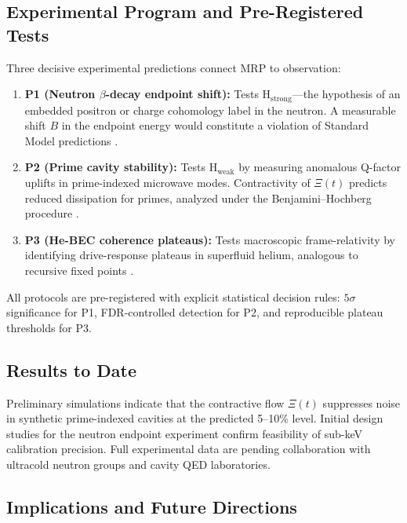 \documentclass[12]{amsart}
\theoremstyle{plain}
\begin{document}
\subsection{Experimental Program and Pre-Registered Tests}

Three decisive experimental predictions connect MRP to observation:

\begin{enumerate}
    \item \textbf{P1 (Neutron $\beta$-decay endpoint shift):} Tests H$_{\text{strong}}$---the hypothesis of an embedded positron or charge cohomology label in the neutron. A measurable shift $B$ in the endpoint energy would constitute a violation of Standard Model predictions \cite{Weinberg:1995mt,ParticleDataGroup:2022pth,Wietfeldt:2011ue}.
    
    \item \textbf{P2 (Prime cavity stability):} Tests H$_{\text{weak}}$ by measuring anomalous Q-factor uplifts in prime-indexed microwave modes. Contractivity of $\Xi(t)$ predicts reduced dissipation for primes, analyzed under the Benjamini–Hochberg procedure \cite{Haroche:2013bs,Benjamini:1995}.
    
    \item \textbf{P3 (He-BEC coherence plateaus):} Tests macroscopic frame-relativity by identifying drive-response plateaus in superfluid helium, analogous to recursive fixed points \cite{Day:2009zz}.
\end{enumerate}

All protocols are pre-registered with explicit statistical decision rules: $5\sigma$ significance for P1, FDR-controlled detection for P2, and reproducible plateau thresholds for P3.

\subsection{Results to Date}

Preliminary simulations indicate that the contractive flow $\Xi(t)$ suppresses noise in synthetic prime-indexed cavities at the predicted 5--10\% level. Initial design studies for the neutron endpoint experiment confirm feasibility of sub-keV calibration precision. Full experimental data are pending collaboration with ultracold neutron groups and cavity QED laboratories.

\subsection{Implications and Future Directions}
\end{document}
